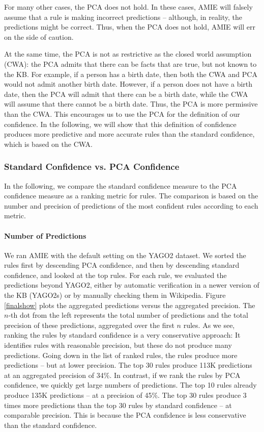 For many other cases, the PCA does not hold. In these cases, AMIE will falsely assume that a rule is making incorrect predictions -- although, in reality,
the predictions might be correct.
Thus, when the PCA does not hold, AMIE will err on the side of caution.

At the same time, the PCA is not as restrictive as the closed world assumption (CWA):
the PCA admits that there can be facts that are true, but not known to the KB.
For example, if a person has a birth date, then both the CWA and PCA would not admit another birth date. However, if a person does not have a birth date, then the PCA will admit that there can be a birth date, while the CWA will assume that there cannot be a birth date. Thus, the PCA is more permissive than the CWA.
This encourages us to use the PCA for the definition of our confidence. In the following, we will show that this definition of confidence produces
 more predictive and more accurate rules than the standard confidence, which is based on the CWA.

\subsubsection{Standard Confidence vs. PCA Confidence }
In the following, we compare the standard confidence measure to the PCA confidence measure as a ranking metric for rules.
The comparison is based on the number and precision of predictions of the most confident rules according to each metric.

\paragraph{Number of Predictions}
We ran AMIE with the default setting on the YAGO2 dataset. %
We sorted the rules first by descending PCA confidence, and then by descending standard confidence, and looked at the top rules.
For each rule, we evaluated the predictions beyond YAGO2, either by automatic verification in a
newer version of the KB (YAGO2s) or by manually checking them in Wikipedia.
Figure \ref{finalshow} plots the aggregated predictions versus the aggregated precision.
The $n$-th dot from the left represents the total number of predictions and the total precision of these predictions, aggregated over the first $n$ rules.
As we see, ranking the rules by standard confidence is a very conservative approach:
It identifies rules with reasonable precision, but these do not produce many predictions.
Going down in the list of ranked rules, the rules produce more predictions -- but at lower precision. The top 30 rules produce 113K predictions at an aggregated precision of 34\%.
In contrast, if we rank the rules by PCA confidence, we quickly get large numbers of predictions. The top 10 rules already produce 135K predictions -- at a precision of 45\%.
The top 30 rules produce 3 times more predictions than the top 30 rules by standard confidence -- at comparable precision.
This is because the PCA confidence is less conservative than the standard confidence.

